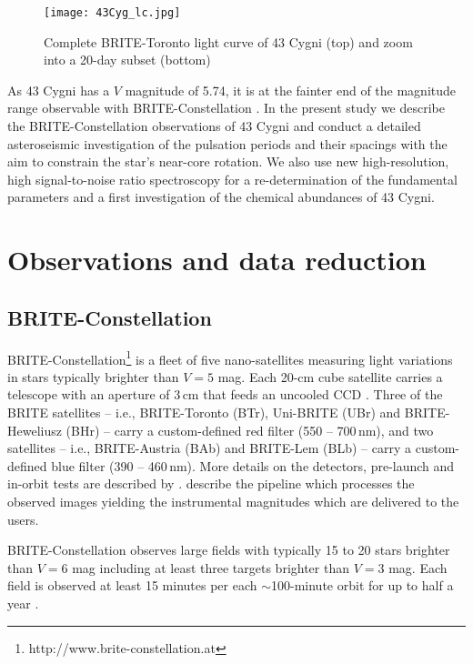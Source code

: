 \documentclass{aa}
\begin{document}
\begin{figure}[ht]
	\begin{center}
	\texttt{[image: 43Cyg\_lc.jpg]}
	\caption{Complete BRITE-Toronto light curve of 43 Cygni (top) and zoom into a 20-day subset (bottom)} 
	\label{fig:lc} 
	\end{center} 
\end{figure}



As 43 Cygni has a $V$ magnitude of 5.74, it is at the fainter end of the magnitude range observable with BRITE-Constellation \citep{weiss2014}. In the present study we describe the BRITE-Constellation observations of 43 Cygni and conduct a detailed asteroseismic investigation of the pulsation periods and their spacings with the aim to constrain the star's near-core rotation. We also use new high-resolution, high signal-to-noise ratio spectroscopy for a re-determination of the fundamental parameters and a first investigation of the chemical abundances of 43 Cygni.


\section{Observations and data reduction}

\subsection{BRITE-Constellation}

BRITE-Constellation\footnote{http://www.brite-constellation.at} is a fleet of five nano-satellites measuring light variations in stars typically brighter than $V=5$ mag. Each 20-cm cube satellite carries a telescope with an aperture of 3\,cm that feeds an uncooled CCD \citep{weiss2014}. Three of the BRITE satellites -- i.e., BRITE-Toronto (BTr), Uni-BRITE (UBr) and BRITE-Heweliusz (BHr) -- carry a custom-defined red filter (550 -- 700\,nm), and two satellites -- i.e., BRITE-Austria (BAb) and BRITE-Lem (BLb) -- carry a custom-defined blue filter (390 -- 460\,nm). More details on the detectors, pre-launch and in-orbit tests are described by \citet{pablo2016}. \citet{popowicz2017} describe the pipeline which processes the observed images yielding the instrumental magnitudes which are delivered to the users. 

BRITE-Constellation observes large fields with typically 15 to 20 stars brighter than $V=6$ mag including at least three targets brighter than $V=3$ mag. Each field is observed at least 15 minutes per each $\sim$100-minute orbit for up to half a year \citep{weiss2014}. 
\end{document}
